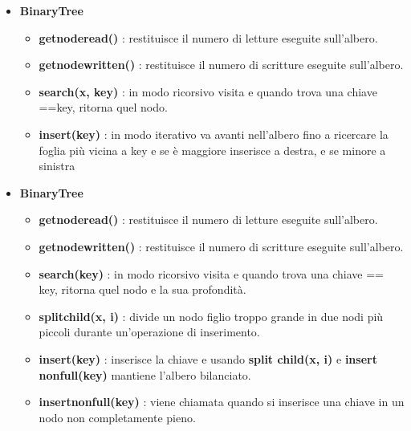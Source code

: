 \begin{itemize}

    \item \textbf{BinaryTree}
    \begin{itemize}

        \item \textbf{get\textunderscore node\textunderscore read()} : restituisce il numero di letture eseguite sull'albero.

        \item \textbf{get\textunderscore node\textunderscore written()} : restituisce il numero di scritture eseguite sull'albero.

        \item \textbf{search(x, key)} : in modo ricorsivo visita e quando trova una chiave ==key, ritorna quel nodo.
        
        \item \textbf{insert(key)} : in modo iterativo va avanti nell'albero fino a ricercare la foglia più vicina a key e se è maggiore inserisce a destra, e se minore a sinistra
        
    \end{itemize}
    
    \item \textbf{BinaryTree}
    \begin{itemize}

        \item \textbf{get\textunderscore node\textunderscore read()} : restituisce il numero di letture eseguite sull'albero.

        \item \textbf{get\textunderscore node\textunderscore written()} : restituisce il numero di scritture eseguite sull'albero.

        \item \textbf{search(key)} : in modo ricorsivo visita e quando trova una chiave == key, ritorna quel nodo e la sua profondità.

        \item \textbf{split\textunderscore child(x, i)} : divide un nodo figlio troppo grande in due nodi più piccoli durante un'operazione di inserimento. 
        
        \item \textbf{insert(key)} : inserisce la  chiave e usando \textbf{split child(x, i)} e \textbf{insert nonfull(key)} mantiene l'albero bilanciato.
        
        \item \textbf{insert\textunderscore nonfull(key)} : viene chiamata quando si inserisce una chiave in un nodo non completamente pieno.
        

\end{itemize}
\end{itemize}
